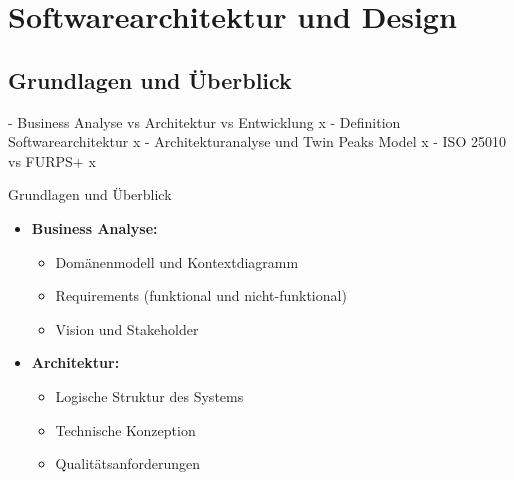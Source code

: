 \section{Softwarearchitektur und Design}

\subsection{Grundlagen und Überblick}
- Business Analyse vs Architektur vs Entwicklung x  
- Definition Softwarearchitektur x
- Architekturanalyse und Twin Peaks Model x
- ISO 25010 vs FURPS+ x

\begin{concept}{Grundlagen und Überblick}
\begin{itemize}
    \item \textbf{Business Analyse:}
    \begin{itemize}
        \item Domänenmodell und Kontextdiagramm
        \item Requirements (funktional und nicht-funktional)
        \item Vision und Stakeholder
    \end{itemize}
    
    \item \textbf{Architektur:}
    \begin{itemize}
        \item Logische Struktur des Systems
        \item Technische Konzeption
        \item Qualitätsanforderungen
    \end{itemize}
    

\end{itemize}
\end{concept}
